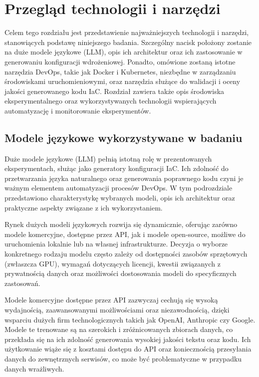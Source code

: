 \clearpage %

\section{Przegląd technologii i narzędzi}

Celem tego rozdziału jest przedstawienie najważniejszych technologii i narzędzi, stanowiących podstawę niniejszego badania. Szczególny nacisk położony zostanie na duże modele językowe (LLM), opis ich architektur oraz ich zastosowanie w generowaniu konfiguracji wdrożeniowej. Ponadto, omówione zostaną istotne narzędzia DevOps, takie jak Docker i Kubernetes, niezbędne w zarządzaniu środowiskami uruchomieniowymi, oraz narzędzia służące do walidacji i oceny jakości generowanego kodu IaC. Rozdział zawiera także opis środowiska eksperymentalnego oraz wykorzystywanych technologii wspierających automatyzację i monitorowanie eksperymentów.

\subsection{Modele językowe wykorzystywane w badaniu}

Duże modele językowe (LLM) pełnią istotną rolę w prezentowanych eksperymentach, służąc jako generatory konfiguracji IaC. Ich zdolność do przetwarzania języka naturalnego oraz generowania poprawnego kodu czyni je ważnym elementem automatyzacji procesów DevOps. W tym podrozdziale przedstawiono charakterystykę wybranych modeli, opis ich architektur oraz praktyczne aspekty związane z ich wykorzystaniem.

Rynek dużych modeli językowych rozwija się dynamicznie, oferując zarówno modele komercyjne, dostępne przez API, jak i modele open-source, możliwe do uruchomienia lokalnie lub na własnej infrastrukturze. Decyzja o wyborze konkretnego rodzaju modelu często zależy od dostępności zasobów sprzętowych (zwłaszcza GPU), wymagań dotyczących licencji, kwestii związanych z prywatnością danych oraz możliwości dostosowania modeli do specyficznych zastosowań.

Modele komercyjne dostępne przez API zazwyczaj cechują się wysoką wydajnością, zaawansowanymi możliwościami oraz niezawodnością, dzięki wsparciu dużych firm technologicznych takich jak OpenAI, Anthropic czy Google. Modele te trenowane są na szerokich i zróżnicowanych zbiorach danych, co przekłada się na ich zdolność generowania wysokiej jakości tekstu oraz kodu. Ich użytkowanie wiąże się z kosztami dostępu do API oraz koniecznością przesyłania danych do zewnętrznych serwisów, co może być problematyczne w przypadku danych wrażliwych.

